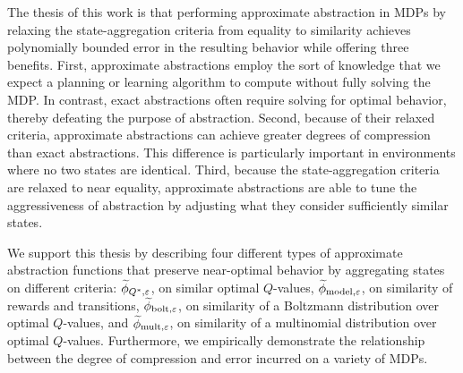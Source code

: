 \renewcommand*{\thefootnote}{\arabic{footnote}}

The thesis of this work is that performing approximate abstraction in \acp{MDP} by relaxing the state-aggregation criteria from equality to similarity achieves polynomially bounded error in the resulting behavior while offering three benefits. First, approximate abstractions employ the sort of knowledge that we expect a planning or learning algorithm to compute without fully solving the \ac{MDP}. In contrast, exact abstractions often require solving for optimal behavior, thereby defeating the purpose of abstraction. Second, because of their relaxed criteria, approximate abstractions can achieve greater degrees of compression than exact abstractions. This difference is particularly important in environments where no two states are identical. Third, because the state-aggregation criteria are relaxed to near equality, approximate abstractions are able to tune the aggressiveness of abstraction by adjusting what they consider sufficiently similar states. 

We support this thesis by describing four different types of approximate abstraction functions that preserve near-optimal behavior by aggregating states on different criteria: $\widetilde \phi_{Q^*,\varepsilon}$, on similar optimal $Q$-values, $\widetilde \phi_{\text{model},\varepsilon}$, on similarity of rewards and transitions, $\widetilde \phi_{\text{bolt},\varepsilon}$, on similarity of a Boltzmann distribution over optimal $Q$-values, and $\widetilde \phi_{\text{mult},\varepsilon}$, on similarity of a multinomial distribution over optimal $Q$-values. Furthermore, we empirically demonstrate the relationship between the degree of compression and error incurred on a variety of \acp{MDP}.

